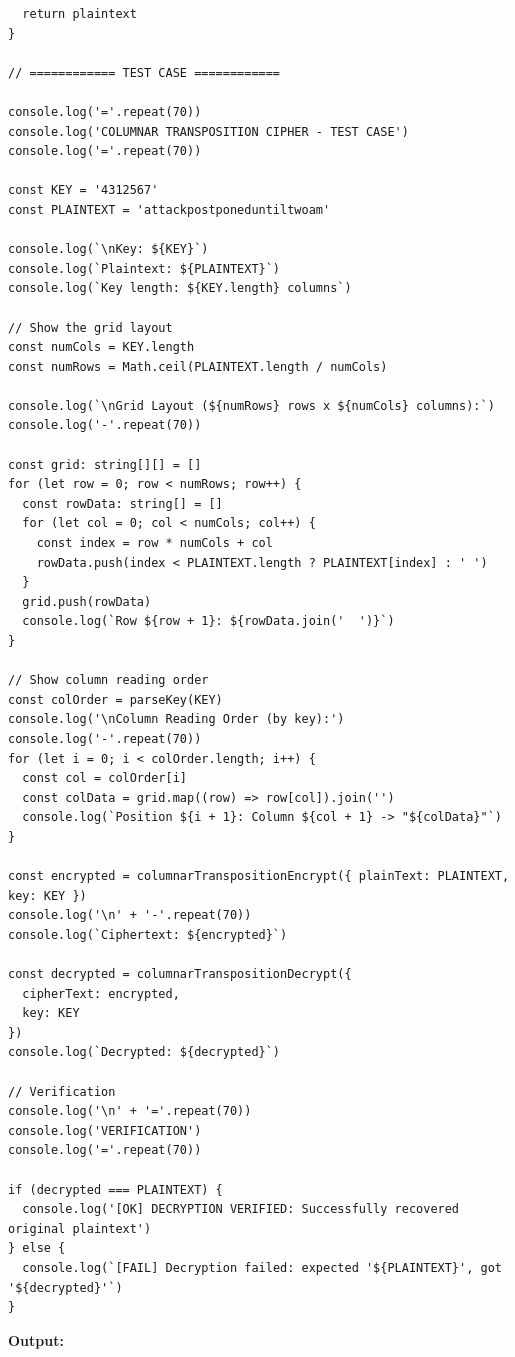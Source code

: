 \documentclass[12pt,a4paper]{article}
\begin{document}
\begin{verbatim}
  return plaintext
}

// ============ TEST CASE ============

console.log('='.repeat(70))
console.log('COLUMNAR TRANSPOSITION CIPHER - TEST CASE')
console.log('='.repeat(70))

const KEY = '4312567'
const PLAINTEXT = 'attackpostponeduntiltwoam'

console.log(`\nKey: ${KEY}`)
console.log(`Plaintext: ${PLAINTEXT}`)
console.log(`Key length: ${KEY.length} columns`)

// Show the grid layout
const numCols = KEY.length
const numRows = Math.ceil(PLAINTEXT.length / numCols)

console.log(`\nGrid Layout (${numRows} rows x ${numCols} columns):`)
console.log('-'.repeat(70))

const grid: string[][] = []
for (let row = 0; row < numRows; row++) {
  const rowData: string[] = []
  for (let col = 0; col < numCols; col++) {
    const index = row * numCols + col
    rowData.push(index < PLAINTEXT.length ? PLAINTEXT[index] : ' ')
  }
  grid.push(rowData)
  console.log(`Row ${row + 1}: ${rowData.join('  ')}`)
}

// Show column reading order
const colOrder = parseKey(KEY)
console.log('\nColumn Reading Order (by key):')
console.log('-'.repeat(70))
for (let i = 0; i < colOrder.length; i++) {
  const col = colOrder[i]
  const colData = grid.map((row) => row[col]).join('')
  console.log(`Position ${i + 1}: Column ${col + 1} -> "${colData}"`)
}

const encrypted = columnarTranspositionEncrypt({ plainText: PLAINTEXT, key: KEY })
console.log('\n' + '-'.repeat(70))
console.log(`Ciphertext: ${encrypted}`)

const decrypted = columnarTranspositionDecrypt({
  cipherText: encrypted,
  key: KEY
})
console.log(`Decrypted: ${decrypted}`)

// Verification
console.log('\n' + '='.repeat(70))
console.log('VERIFICATION')
console.log('='.repeat(70))

if (decrypted === PLAINTEXT) {
  console.log('[OK] DECRYPTION VERIFIED: Successfully recovered original plaintext')
} else {
  console.log(`[FAIL] Decryption failed: expected '${PLAINTEXT}', got '${decrypted}'`)
}
\end{verbatim}

\vspace{0.5cm}

\noindent \large \textbf{Output:} \\
\normalsize
\end{document}
